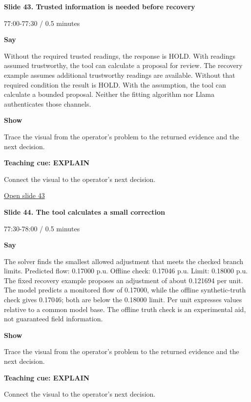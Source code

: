 \documentclass[12pt,letterpaper]{article}
\begin{document}
{\Large\bfseries\color{IEEEBlue} Slide 43. Trusted information is needed before recovery\par}\medskip
{\small\color{Slate} 77:00-77:30 /\allowbreak{} 0.5 minutes\par}\medskip
\textbf{Say}\par Without the required trusted readings, the response is HOLD. With readings assumed trustworthy, the tool can calculate a proposal for review. The recovery example assumes additional trustworthy readings are available. Without that required condition the result is HOLD. With the assumption, the tool can calculate a bounded proposal. Neither the fitting algorithm nor Llama authenticates those channels.\par\medskip
\textbf{Show}\par Trace the visual from the operator's problem to the returned evidence and the next decision.\par\medskip
\textbf{Teaching cue: EXPLAIN}\par Connect the visual to the operator's next decision.\par\medskip
\vfill\href{https://alaaselim-sudo.github.io/GridGuard-Agentic-AI-Tutorials/operator-cases/#/43}{Open slide 43}\par
\clearpage{}
{\Large\bfseries\color{IEEEBlue} Slide 44. The tool calculates a small correction\par}\medskip
{\small\color{Slate} 77:30-78:00 /\allowbreak{} 0.5 minutes\par}\medskip
\textbf{Say}\par The solver finds the smallest allowed adjustment that meets the checked branch limits. Predicted flow: 0.17000 p.u. Offline check: 0.17046 p.u. Limit: 0.18000 p.u. The fixed recovery example proposes an adjustment of about 0.121694 per unit. The model predicts a monitored flow of 0.17000, while the offline synthetic-truth check gives 0.17046; both are below the 0.18000 limit. Per unit expresses values relative to a common model base. The offline truth check is an experimental aid, not guaranteed field information.\par\medskip
\textbf{Show}\par Trace the visual from the operator's problem to the returned evidence and the next decision.\par\medskip
\textbf{Teaching cue: EXPLAIN}\par Connect the visual to the operator's next decision.\par\medskip
\end{document}
